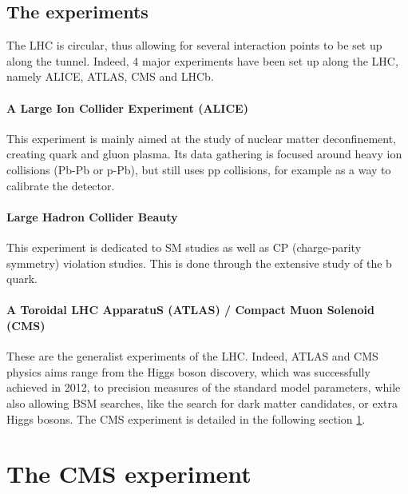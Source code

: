\subsection{The experiments}

The LHC is circular, thus allowing for several interaction points to be set up along the tunnel. Indeed, 4 major experiments have been set up along the LHC, namely ALICE, ATLAS, CMS and LHCb.

\paragraph{A Large Ion Collider Experiment (ALICE)} This experiment is mainly aimed at the study of nuclear matter deconfinement, creating quark and gluon plasma. Its data gathering is focused around heavy ion collisions (Pb-Pb or p-Pb), but still uses pp collisions, for example as a way to calibrate the detector.

\paragraph{Large Hadron Collider Beauty} This experiment is dedicated to SM studies as well as CP (charge-parity symmetry) violation studies. This is done through the extensive study of the b quark.

\paragraph{A Toroidal LHC ApparatuS (ATLAS) / Compact Muon Solenoid (CMS)} These are the generalist experiments of the LHC. Indeed, ATLAS and CMS physics aims range from the Higgs boson discovery, which was successfully achieved in 2012, to precision measures of the standard model parameters, while also allowing BSM searches, like the search for dark matter candidates, or extra Higgs bosons. The CMS experiment is detailed in the following section \ref{sec:CMS}.


\section{The CMS experiment}
\label{sec:CMS}

